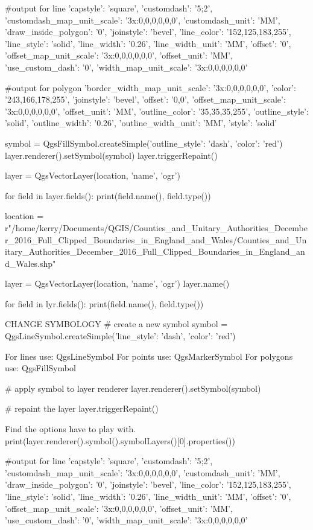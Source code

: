 #output for line
{'capstyle': 'square', 'customdash': '5;2', 'customdash_map_unit_scale': '3x:0,0,0,0,0,0', 'customdash_unit': 'MM', 'draw_inside_polygon': '0', 'joinstyle': 'bevel', 'line_color': '152,125,183,255', 'line_style': 'solid', 'line_width': '0.26', 'line_width_unit': 'MM', 'offset': '0', 'offset_map_unit_scale': '3x:0,0,0,0,0,0', 'offset_unit': 'MM', 'use_custom_dash': '0', 'width_map_unit_scale': '3x:0,0,0,0,0,0'}

#output for polygon
{'border_width_map_unit_scale': '3x:0,0,0,0,0,0', 'color': '243,166,178,255', 'joinstyle': 'bevel', 'offset': '0,0', 'offset_map_unit_scale': '3x:0,0,0,0,0,0', 'offset_unit': 'MM', 'outline_color': '35,35,35,255', 'outline_style': 'solid', 'outline_width': '0.26', 'outline_width_unit': 'MM', 'style': 'solid'}

symbol = QgsFillSymbol.createSimple({'outline_style': 'dash', 'color': 'red'})
layer.renderer().setSymbol(symbol)
layer.triggerRepaint()


layer = QgsVectorLayer(location, 'name', 'ogr')

for field in layer.fields():
	print(field.name(), field.type())
	
	
	
	
	

location = r"/home/kerry/Documents/QGIS/Counties_and_Unitary_Authorities_December_2016_Full_Clipped_Boundaries_in_England_and_Wales/Counties_and_Unitary_Authorities_December_2016_Full_Clipped_Boundaries_in_England_and_Wales.shp"

layer = QgsVectorLayer(location, 'name', 'ogr')
layer.name()

for field in lyr.fields():
	print(field.name(), field.type())


CHANGE SYMBOLOGY
# create a new symbol
symbol = QgsLineSymbol.createSimple({'line_style': 'dash', 'color': 'red'})


For lines use: QgsLineSymbol
For points use: QgsMarkerSymbol
For polygons use: QgsFillSymbol

# apply symbol to layer renderer
layer.renderer().setSymbol(symbol)

# repaint the layer
layer.triggerRepaint()


Find the options have to play with.
print(layer.renderer().symbol().symbolLayers()[0].properties())

#output for line
{'capstyle': 'square', 'customdash': '5;2', 'customdash_map_unit_scale': '3x:0,0,0,0,0,0', 'customdash_unit': 'MM', 'draw_inside_polygon': '0', 'joinstyle': 'bevel', 'line_color': '152,125,183,255', 'line_style': 'solid', 'line_width': '0.26', 'line_width_unit': 'MM', 'offset': '0', 'offset_map_unit_scale': '3x:0,0,0,0,0,0', 'offset_unit': 'MM', 'use_custom_dash': '0', 'width_map_unit_scale': '3x:0,0,0,0,0,0'}

